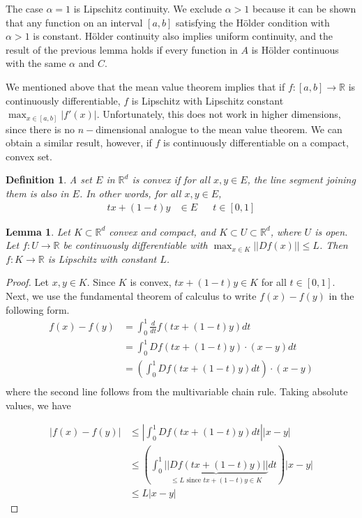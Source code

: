 \documentclass[12pt]{amsart}         %
\newtheorem{definition}{Definition}[section]
\newtheorem{lemma}{Lemma}[section]
\theoremstyle{remark}
\newcommand{\R}{\mathbb{R}}
\begin{document}
The case $\alpha = 1$ is Lipschitz continuity. We exclude $\alpha > 1$ because it can be shown that any function on an interval $[a, b]$ satisfying the H\"{o}lder condition with $\alpha > 1$ is constant. H\"{o}lder continuity also implies uniform continuity, and the result of the previous lemma holds if every function in $A$ is H\"{o}lder continuous with the same $\alpha$ and $C$.

We mentioned above that the mean value theorem implies that if $f: [a, b] \rightarrow \R$ is continuously differentiable, $f$ is Lipschitz with Lipschitz constant $\max_{x\in [a,b]}|f'(x)|$.  Unfortunately, this does not work in higher dimensions, since there is no $n-$dimensional analogue to the mean value theorem.  We can obtain a similar result, however, if $f$ is continuously differentiable on a compact, convex set.

\begin{definition}
A set $E$ in $\R^d$ is convex if for all $x, y \in E$, the line segment joining them is also in $E$. In other words, for all $x, y \in E$,
\begin{align*}
tx + (1 - t)y &\in E && t \in [0, 1]
\end{align*}
\end{definition}

\begin{lemma}
Let $K \subset \R^d$ convex and compact, and $K \subset U \subset \R^d$, where $U$ is open. Let $f: U \rightarrow \R$ be continuously differentiable  with $\max_{x \in K} ||Df(x)|| \leq L$. Then $f: K \rightarrow \R$ is Lipschitz with constant $L$.
\end{lemma}

\begin{proof}
Let $x,y \in K$. Since $K$ is convex, $tx + (1 - t)y \in K$ for all 
$t \in [0,1]$. Next, we use the fundamental theorem of calculus to write $f(x)- f(y)$ in the following form.
\begin{align*}
f(x)- f(y) &= \int_0^1 \frac{d}{dt} f(tx + (1-t)y) dt \\
&= \int_0^1 Df(tx + (1-t)y) \cdot (x-y) dt \\
&= \left( \int_0^1 Df(tx + (1-t)y) dt \right) \cdot (x-y) \\
\end{align*}
where the second line follows from the multivariable chain rule. Taking absolute values, we have

\begin{align*}        
|f(x)- f(y)| &\leq \left| \int_0^1 Df(tx + (1-t)y) dt \right| |x-y| \\
&\leq \left( \int_0^1 \underbrace{ || Df(tx + (1-t)y) || }_{\leq L \text{ since } tx + (1 - t)y \in K } dt \right) |x-y| \\
&\leq L |x-y|
\end{align*}
    
\end{proof}
\end{document}
